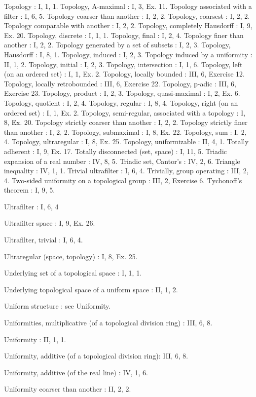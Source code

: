 Topology : I, 1, 1. Topology, A-maximal : I, 3, Ex. 11. Topology associated with a filter : I, 6, 5. Topology coarser than another : I, 2, 2. Topology, coarsest : I, 2, 2. Topology comparable with another : I, 2, 2. Topology, completely Hausdorff : I, 9, Ex. 20. Topology, discrete : I, 1, 1. Topology, final : I, 2, 4. Topology finer than another : I, 2, 2. Topology generated by a set of subsets : I, 2, 3. Topology, Hausdorff : I, 8, 1. Topology, induced : I, 2, 3. Topology induced by a uniformity : II, 1, 2. Topology, initial : I, 2, 3. Topology, intersection : I, 1, 6. Topology, left (on an ordered set) : I, 1, Ex. 2. Topology, locally bounded : III, 6, Exercise 12. Topology, locally retrobounded : III, 6, Exercise 22. Topology, p-adic : III, 6, Exercise 23. Topology, product : I, 2, 3. Topology, quasi-maximal : I, 2, Ex. 6. Topology, quotient : I, 2, 4. Topology, regular : I, 8, 4. Topology, right (on an ordered set) : I, 1, Ex. 2. Topology, semi-regular, associated with a topology : I, 8, Ex. 20. Topology strictly coarser than another : I, 2, 2. Topology strictly finer than another : I, 2, 2. Topology, submaximal : I, 8, Ex. 22. Topology, sum : I, 2, 4. Topology, ultraregular : I, 8, Ex. 25. Topology, uniformizable : II, 4, 1. Totally adherent : I, 9, Ex. 17. Totally disconnected (set, space) : I, 11, 5. Triadic expansion of a real number : IV, 8, 5. Triadic set, Cantor's : IV, 2, 6. Triangle inequality : IV, 1, 1. Trivial ultrafilter : I, 6, 4. Trivially, group operating : III, 2, 4. Two-sided uniformity on a topological group : III, 2, Exercise 6. Tychonoff's theorem : I, 9, 5.

Ultrafilter : I, 6, 4

Ultrafilter space : I, 9, Ex. 26.

Ultrafilter, trivial : I, 6, 4.

Ultraregular (space, topology) : I, 8, Ex. 25.

Underlying set of a topological space : I, 1, 1.

Underlying topological space of a uniform space : II, 1, 2.

Uniform structure : see Uniformity.

Uniformities, multiplicative (of a topological division ring) : III, 6, 8.

Uniformity : II, 1, 1.

Uniformity, additive (of a topological division ring): III, 6, 8.

Uniformity, additive (of the real line) : IV, 1, 6.

Uniformity coarser than another : II, 2, 2.


